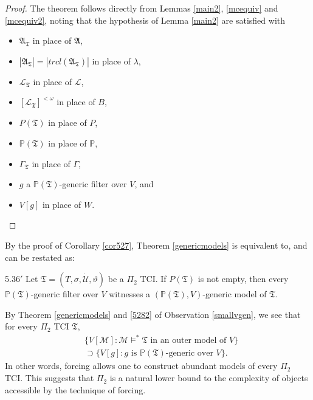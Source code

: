 \documentclass[12pt]{article}
\numberwithin{equation}{section}
\begin{document}
\begin{proof}
The theorem follows directly from Lemmas \ref{main2}, \ref{mcequiv} and \ref{mcequiv2}, noting that the hypothesis of Lemma \ref{main2} are satisfied with
\begin{itemize}
    \item $\mathfrak{A}_{\mathfrak{T}}$ in place of $\mathfrak{A}$,
    \item $|\mathfrak{A}_{\mathfrak{T}}| = |trcl(\mathfrak{A}_{\mathfrak{T}})|$ in place of $\lambda$,
    \item $\mathcal{L}_{\mathfrak{T}}$ in place of $\mathcal{L}$,
    \item $[\mathcal{L}_{\mathfrak{T}}]^{< \omega}$ in place of $B$,
    \item $P(\mathfrak{T})$ in place of $P$,
    \item $\mathbb{P}(\mathfrak{T})$ in place of $\mathbb{P}$, 
    \item $\Gamma_{\mathfrak{T}}$ in place of $\Gamma$,
    \item $g$ a $\mathbb{P}(\mathfrak{T})$-generic filter over $V$, and
    \item $V[g]$ in place of $W$. \qedhere
\end{itemize}
\end{proof}

\begin{rem}\label{rem537}
By the proof of Corollary \ref{cor527}, Theorem \ref{genericmodels} is equivalent to, and can be restated as:
\begin{customthm}{5.36$'$}
Let $\mathfrak{T} = (T, \sigma, \dot{\mathcal{U}}, \vartheta)$ be a $\Pi_2$ TCI. If $P(\mathfrak{T})$ is not empty, then every $\mathbb{P}(\mathfrak{T})$-generic filter over $V$ witnesses a $(\mathbb{P}(\mathfrak{T}), V)$-generic model of $\mathfrak{T}$.
\end{customthm}
\end{rem}

\begin{rem}\label{ramble2}
By Theorem \ref{genericmodels} and \ref{5282} of Observation \ref{smallvgen}, we see that for every $\Pi_2$ TCI $\mathfrak{T}$,
\begin{align*}
    & \{V[\mathcal{M}] : \mathcal{M} \models^* \mathfrak{T} \text{ in an outer model of } V\} \\
    & \supset \{V[g] : g \text{ is } \mathbb{P}(\mathfrak{T}) \text{-generic over } V\} \text{.}
\end{align*}
In other words, forcing allows one to construct abundant models of every $\Pi_2$ TCI. This suggests that $\Pi_2$ is a natural lower bound to the complexity of objects accessible by the technique of forcing.
\end{rem}
\end{document}
